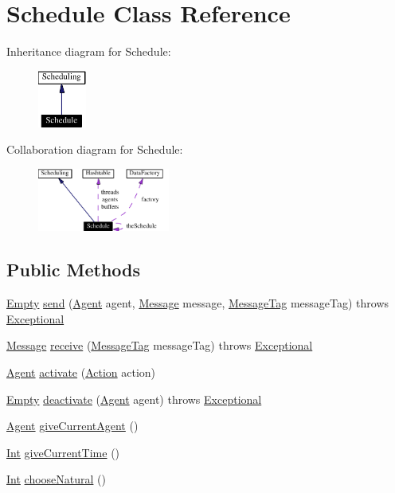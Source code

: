 \hypertarget{classSchedule}{
\section{Schedule  Class Reference}
\label{classSchedule}
}
Inheritance diagram for Schedule:\begin{figure}[H]
\begin{center}
\leavevmode
\includegraphics[width=45pt]{classSchedule__inherit__graph}
\end{center}
\end{figure}
Collaboration diagram for Schedule:\begin{figure}[H]
\begin{center}
\leavevmode
\includegraphics[width=123pt]{classSchedule__coll__graph}
\end{center}
\end{figure}
\subsection*{Public Methods}
\begin{CompactItemize}
\item 
\hyperlink{interfaceEmpty}{Empty} \hyperlink{classSchedule_a0}{send} (\hyperlink{interfaceAgent}{Agent} agent, \hyperlink{interfaceMessage}{Message} message, \hyperlink{interfaceMessageTag}{Message\-Tag} message\-Tag) throws \hyperlink{classExceptional}{Exceptional}
\item 
\hyperlink{interfaceMessage}{Message} \hyperlink{classSchedule_a1}{receive} (\hyperlink{interfaceMessageTag}{Message\-Tag} message\-Tag) throws \hyperlink{classExceptional}{Exceptional}
\item 
\hyperlink{interfaceAgent}{Agent} \hyperlink{classSchedule_a2}{activate} (\hyperlink{interfaceAction}{Action} action)
\item 
\hyperlink{interfaceEmpty}{Empty} \hyperlink{classSchedule_a3}{deactivate} (\hyperlink{interfaceAgent}{Agent} agent) throws \hyperlink{classExceptional}{Exceptional}
\item 
\hyperlink{interfaceAgent}{Agent} \hyperlink{classSchedule_a4}{give\-Current\-Agent} ()
\item 
\hyperlink{interfaceInt}{Int} \hyperlink{classSchedule_a5}{give\-Current\-Time} ()
\item 
\hyperlink{interfaceInt}{Int} \hyperlink{classSchedule_a6}{choose\-Natural} ()
\end{CompactItemize}
